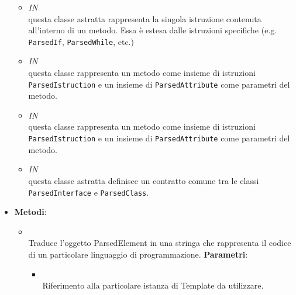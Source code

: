 \begin{itemize}
\begin{itemize}
\item \textit{IN} \hyperref[\nogloxy{swedesigner::server::project::ParsedInstruction}]{}\\
questa classe astratta rappresenta la singola istruzione contenuta all'interno di un metodo. Essa è estesa dalle istruzioni specifiche (e.g. \texttt{ParsedIf}, \texttt{ParsedWhile}, etc.)
\item \textit{IN} \hyperref[\nogloxy{swedesigner::server::project::ParsedMethod}]{}\\
questa classe rappresenta un metodo come insieme di istruzioni \texttt{ParsedIstruction} e un insieme di \texttt{ParsedAttribute} come parametri del metodo.
\item \textit{IN} \hyperref[\nogloxy{swedesigner::server::project::ParsedMethod}]{}\\
questa classe rappresenta un metodo come insieme di istruzioni \texttt{ParsedIstruction} e un insieme di \texttt{ParsedAttribute} come parametri del metodo.
\item \textit{IN} \hyperref[\nogloxy{swedesigner::server::project::ParsedType}]{}\\
questa classe astratta definisce un contratto comune tra le classi \texttt{ParsedInterface} e \texttt{ParsedClass}. 
\end{itemize}
\item \textbf{Metodi}:
\begin{itemize}
\item {}
\\ Traduce l'oggetto ParsedElement in una stringa che rappresenta il codice di un particolare linguaggio di programmazione.
\textbf{Parametri}:
\begin{itemize}
\item {}
\\ Riferimento alla particolare istanza di Template da utilizzare.
\end{itemize}
\end{itemize}
\end{itemize}

